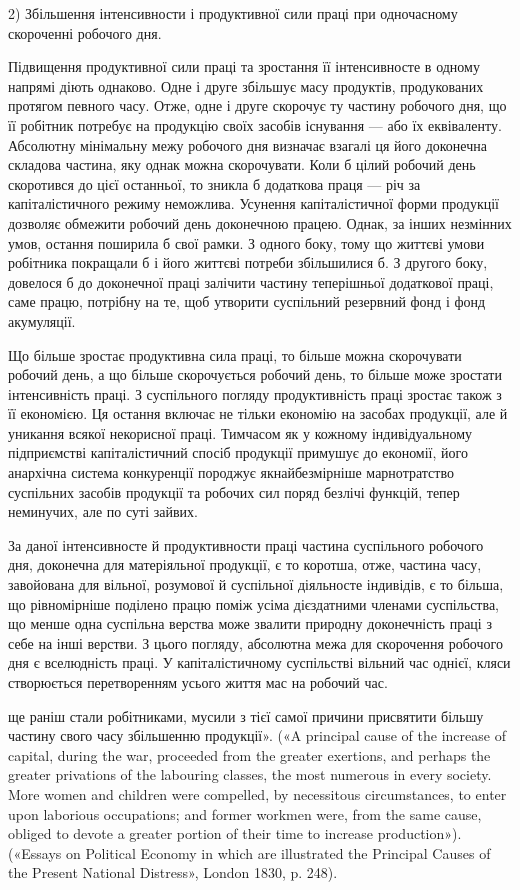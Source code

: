 2) Збільшення інтенсивности і продуктивної сили праці при
одночасному скороченні робочого дня.

Підвищення продуктивної сили праці та зростання її інтенсивносте
в одному напрямі діють однаково. Одне і друге збільшує
масу продуктів, продукованих протягом певного часу. Отже,
одне і друге скорочує ту частину робочого дня, що її робітник
потребує на продукцію своїх засобів існування — або їх еквіваленту.
Абсолютну мінімальну межу робочого дня визначає
взагалі ця його доконечна складова частина, яку однак можна
скорочувати. Коли б цілий робочий день скоротився до цієї останньої,
то зникла б додаткова праця — річ за капіталістичного
режиму неможлива. Усунення капіталістичної форми продукції
дозволяє обмежити робочий день доконечною працею. Однак, за
інших незмінних умов, остання поширила б свої рамки. З одного
боку, тому що життєві умови робітника покращали б і його життєві
потреби збільшилися б. З другого боку, довелося б до доконечної
праці залічити частину теперішньої додаткової праці,
саме працю, потрібну на те, щоб утворити суспільний резервний
фонд і фонд акумуляції.

Що більше зростає продуктивна сила праці, то більше можна
скорочувати робочий день, а що більше скорочується робочий
день, то більше може зростати інтенсивність праці. З суспільного
погляду продуктивність праці зростає також з її економією. Ця
остання включає не тільки економію на засобах продукції, але й
уникання всякої некорисної праці. Тимчасом як у кожному індивідуальному
підприємстві капіталістичний спосіб продукції примушує
до економії, його анархічна система конкуренції породжує
якнайбезмірніше марнотратство суспільних засобів продукції
та робочих сил поряд безлічі функцій, тепер неминучих, але по
суті зайвих.

За даної інтенсивносте й продуктивности праці частина суспільного
робочого дня, доконечна для матеріяльної продукції,
є то коротша, отже, частина часу, завойована для вільної, розумової
й суспільної діяльносте індивідів, є то більша, що рівномірніше
поділено працю поміж усіма дієздатними членами суспільства,
що менше одна суспільна верства може звалити природну
доконечність праці з себе на інші верстви. З цього погляду,
абсолютна межа для скорочення робочого дня є вселюдність праці.
У капіталістичному суспільстві вільний час однієї, кляси створюється
перетворенням усього життя мас на робочий час.

ще раніш стали робітниками, мусили з тієї самої причини присвятити
більшу частину свого часу збільшенню продукції». («A principal cause
of the increase of capital, during the war, proceeded from the greater exertions,
and perhaps the greater privations of the labouring classes, the most
numerous in every society. More women and children were compelled, by
necessitous circumstances, to enter upon laborious occupations; and former
workmen were, from the same cause, obliged to devote a greater portion
of their time to increase production»). («Essays on Political Economy in
which are illustrated the Principal Causes of the Present National Distress»,
London 1830, p. 248).
